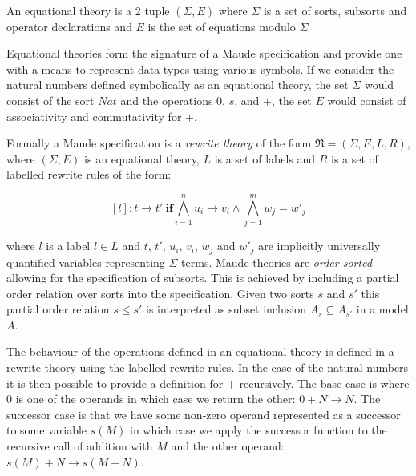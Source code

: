 \medskip
\begin{mydef}
An equational theory is a 2 tuple $(\Sigma, E)$ where $\Sigma$ is a set of sorts, subsorts and operator declarations  and $E$ is the set of equations modulo $\Sigma$
\end{mydef}

Equational theories \cite{JM98} form the signature of a Maude specification and provide one with a means to represent data types using various symbols. If we consider the natural numbers defined symbolically  as an equational theory, the set $\Sigma$ would consist of the sort $Nat$ and the operations $0$, $s$, and $+$, the set $E$ would consist of associativity and commutativity for $+$.

Formally a Maude specification is a \emph{rewrite theory} \cite{JM98} of the form $\mathfrak{R}=(\Sigma,E,L,R)$, where  $(\Sigma, E)$ is an equational theory, $L$ is a set of labels and $R$ is a set of labelled rewrite rules of the form:

$$ [l] : t \to t' \ \mathbf{if} \bigwedge^{n}_{i = 1} u_i \to v_i  \wedge \bigwedge^{m}_{j = 1} w_j = w'_j $$

where $l$ is a label $l \in L$ and $t$, $t'$, $u_i$, $v_i$, $w_j$ and $w'_j$ are implicitly universally quantified variables representing $\Sigma$-terms. Maude theories are \emph{order-sorted} allowing for the specification of subsorts. This is achieved by including a partial order relation over sorts into the specification. Given two sorts $s$ and $s'$ this partial order relation $s \leq s'$ is interpreted as subset inclusion $A_s \subseteq A_{s'}$ in a model $A$.

The behaviour of the operations defined in an equational theory is defined in a rewrite theory using the labelled rewrite rules. In the case of the natural numbers it is then possible to provide a definition for $+$ recursively. The base case is where $0$ is one of the operands in which case we return the other: $0 + N \to N$. The successor case is that we have some non-zero operand represented as a successor to some variable $s(M)$ in which case we apply the successor function to the recursive call of addition with $M$ and the other operand: $s(M) + N \to s(M + N)$. 
 

